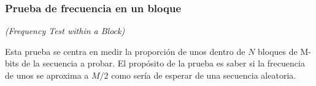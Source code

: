 


\subsubsection{Prueba de frecuencia en un bloque} %
\textit{(Frequency Test within a Block)}

Esta prueba se centra en medir la proporción de unos dentro de $N$ bloques de
M-bits de la secuencia a probar. El propósito de la prueba es saber si la
frecuencia de unos se aproxima a $M/2$ como sería de esperar de una secuencia
aleatoria.


